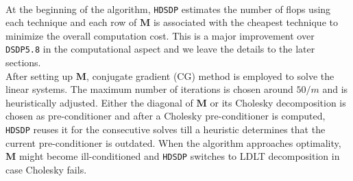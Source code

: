 \begin{center}
\end{center}\


At the beginning of the algorithm, {{\texttt{HDSDP}}} estimates the
number of flops using each technique and each row of $\mathbf{M}$ is associated with the cheapest
technique to minimize the overall computation cost. This is a major
improvement over {{\texttt{DSDP5.8}}} in the computational aspect and 
we leave the details to the later sections. \\

After setting up $\mathbf{M}$, conjugate gradient (CG) method is
employed to solve the linear systems. The maximum number of iterations is
chosen around $50 / m$ and is heuristically adjusted. Either the diagonal of
$\mathbf{M}$ or its Cholesky decomposition is chosen as pre-conditioner and
after a Cholesky pre-conditioner is computed, {{\texttt{HDSDP}}} reuses it for 
the consecutive solves till a heuristic determines that the current
pre-conditioner is outdated. When the algorithm approaches optimality, $\mathbf{M}$
might become ill-conditioned and {{\texttt{HDSDP}}} switches to {\textsf{LDLT}} decomposition in case Cholesky fails.\\

